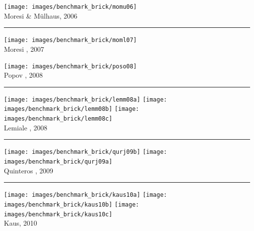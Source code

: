 \begin{center}
\texttt{[image: images/benchmark\_brick/momu06]}\\
{\captionfont Moresi \& M{\"u}lhaus, 2006 \cite{momu06}}
\end{center}

\begin{center}\noindent\rule{12cm}{0.4pt}\end{center}

\begin{center}
\begin{minipage}{0.45\textwidth}
\centering
\texttt{[image: images/benchmark\_brick/moml07]}\\
{\captionfont Moresi \etal, 2007 \cite{moml07}}
\end{minipage}\hfill
\begin{minipage}{0.45\textwidth}
\centering
\texttt{[image: images/benchmark\_brick/poso08]}\\
{\captionfont Popov \etal, 2008 \cite{poso08}}
\end{minipage}
\end{center}

\begin{center}\noindent\rule{12cm}{0.4pt}\end{center}

\begin{center}
\texttt{[image: images/benchmark\_brick/lemm08a]}
\texttt{[image: images/benchmark\_brick/lemm08b]}
\texttt{[image: images/benchmark\_brick/lemm08c]}\\
{\captionfont Lemiale \etal, 2008 \cite{lemm08}}
\end{center}

\begin{center}\noindent\rule{12cm}{0.4pt}\end{center}

\begin{center}
\texttt{[image: images/benchmark\_brick/qurj09b]}
\texttt{[image: images/benchmark\_brick/qurj09a]}\\
{\captionfont Quinteros \etal, 2009 \cite{qurj09}}
\end{center}

\begin{center}\noindent\rule{12cm}{0.4pt}\end{center}

\begin{center}
\texttt{[image: images/benchmark\_brick/kaus10a]}
\texttt{[image: images/benchmark\_brick/kaus10b]}
\texttt{[image: images/benchmark\_brick/kaus10c]}\\
{\captionfont Kaus, 2010 \cite{kaus10}}
\end{center}

